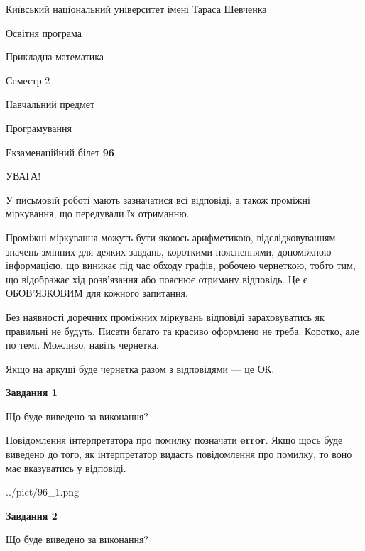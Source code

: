 \documentclass[12pt, ukrainian]{article}
\begin{document}
{{\begin {small}\par
{ \center  Київський національний університет імені Тараса Шевченка \par}
{\parbox {5 cm}{Освітня програма \hfill}{\parbox {7 cm}{Прикладна математика \hfill}}\parbox {6 cm}{\hfill Семестр 2}}\par
{\parbox {5 cm} {Навчальний предмет \hfill}\parbox {7 cm}{Програмування \hfill}\parbox {6cm}{\hfill}\par}\vspace{-7pt} \end{small}}{\center Екзаменаційний білет \No \textbf
{ 96 }\par}}
{
\begin {large}
УВАГА!

У письмовій роботі мають зазначатися всі відповіді, а також проміжні міркування, що передували їх отриманню.

Проміжні міркування можуть бути якоюсь арифметикою, відслідковуванням зна\-чень змінних для деяких завдань,
короткими поясненнями, допоміжною інформацією, що виникає під час обходу графів, робочею чернеткою,
тобто тим, що відображає хід розв’язання або пояснює отриману відповідь.
Це є ОБОВ’ЯЗКОВИМ для кожного запитання.

Без наявності доречних проміжних міркувань відповіді зараховуватись як правиль\-ні не будуть.
Писати багато та красиво оформлено не треба. Коротко, але по темі. Можли\-во, навіть чернетка.

Якщо на аркуші буде чернетка разом з відповідями --- це ОК.

\newpage

{\begin {center}\textbf{Завдання 1}\end {center}}\par
Що буде виведено за виконання?

Повідомлення інтерпретатора про помилку позначати \textbf{error}.
Якщо щось буде виведено до того, як інтерпретатор видасть повідомлення про помилку, 
то воно має вказуватись у відповіді. \par


\begin{center}
	{../pict/96_1.png}
\end{center}
\newpage

{\begin {center}\textbf{Завдання 2}\end {center}}\par
Що буде виведено за виконання?


\end{large}}
\end{document}
